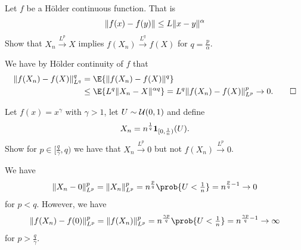 \begin{exercise}
    Let \(f\) be a Hölder continuous function. That is
    \[
        \lVert f(x) - f(y)\rVert \le L \lVert x-y\rVert^\alpha
    \]
    Show that \(X_n \overset{L^p}\to X\) implies \(f(X_n) \overset{L^q}\to f(X)\) for \(q = \frac{p}{\alpha}\).
    \begin{solution}
        We have by Hölder continuity of \(f\) that
        \begin{align*}
            \norm{f(X_n)- f(X)}_{L^q}^q
            &= \E{\norm{f(X_n) - f(X)}^q}
            \\
            &\le \E{L^q \norm{X_n - X}^{\alpha q}}
            = L^q \norm{f(X_n) - f(X)}_{L^p}^p \to 0.
            \qedhere
        \end{align*}
    \end{solution}
\end{exercise}

\begin{exercise}
    Let \(f(x) = x^\gamma\) with \(\gamma >1\), let \(U\sim \mathcal{U}(0,1)\) and define
    \[
        X_n = n^{\frac1q} \ind{[0, \frac1n)}(U).
    \]
    Show for \(p\in [\frac{q}\gamma, q)\) we have that \(X_n \overset{L^p}\to 0\)
    but not \(f(X_n) \overset{L^p}\to 0\).
    \begin{solution}
        We have
        \[
            \norm{X_n-0}_{L^p}^p = \norm{X_n}_{L^p}^p = n^{\frac{p}{q}} \prob{U < \tfrac1n} = n^{\frac{p}{q}-1} \to 0
        \]
        for \(p < q\). However, we have
        \[
            \norm{f(X_n)- f(0)}_{L^p}^p = \norm{f(X_n)}_{L^p}^p = n^{\frac{\gamma p}{q}} \prob{U < \tfrac1n} = n^{\frac{\gamma p}{q}-1} \to \infty
        \]
        for \(p > \frac{q}\gamma\).    
    \end{solution}
\end{exercise}

